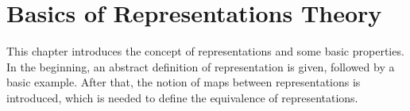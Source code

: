 \section{Basics of Representations Theory}

This chapter introduces the concept of representations and some basic properties.
In the beginning, an abstract definition of representation is given, followed by a basic example.
After that, the notion of maps between representations is introduced, which is needed to define the equivalence of representations.


